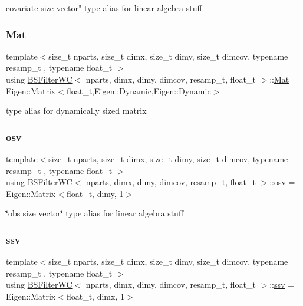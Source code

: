 covariate size vector" type alias for linear algebra stuff \mbox{\label{classBSFilterWC_a507a06203a27e3a025a43be68b4b0e0e}} 
\subsubsection{\texorpdfstring{Mat}{Mat}}
{\footnotesize\ttfamily template$<$size\+\_\+t nparts, size\+\_\+t dimx, size\+\_\+t dimy, size\+\_\+t dimcov, typename resamp\+\_\+t , typename float\+\_\+t $>$ \\
using \hyperlink{classBSFilterWC}{B\+S\+Filter\+WC}$<$ nparts, dimx, dimy, dimcov, resamp\+\_\+t, float\+\_\+t $>$\+::\hyperlink{classBSFilterWC_a507a06203a27e3a025a43be68b4b0e0e}{Mat} =  Eigen\+::\+Matrix$<$float\+\_\+t,Eigen\+::\+Dynamic,Eigen\+::\+Dynamic$>$}

type alias for dynamically sized matrix \mbox{\label{classBSFilterWC_a48b0c7f1a1cf7e57300cf820e74057ce}} 
\subsubsection{\texorpdfstring{osv}{osv}}
{\footnotesize\ttfamily template$<$size\+\_\+t nparts, size\+\_\+t dimx, size\+\_\+t dimy, size\+\_\+t dimcov, typename resamp\+\_\+t , typename float\+\_\+t $>$ \\
using \hyperlink{classBSFilterWC}{B\+S\+Filter\+WC}$<$ nparts, dimx, dimy, dimcov, resamp\+\_\+t, float\+\_\+t $>$\+::\hyperlink{classBSFilterWC_a48b0c7f1a1cf7e57300cf820e74057ce}{osv} =  Eigen\+::\+Matrix$<$float\+\_\+t, dimy, 1$>$}

\char`\"{}obs size vector\char`\"{} type alias for linear algebra stuff \mbox{\label{classBSFilterWC_afff292a8cc15505cc3aa244135203c78}} 
\subsubsection{\texorpdfstring{ssv}{ssv}}
{\footnotesize\ttfamily template$<$size\+\_\+t nparts, size\+\_\+t dimx, size\+\_\+t dimy, size\+\_\+t dimcov, typename resamp\+\_\+t , typename float\+\_\+t $>$ \\
using \hyperlink{classBSFilterWC}{B\+S\+Filter\+WC}$<$ nparts, dimx, dimy, dimcov, resamp\+\_\+t, float\+\_\+t $>$\+::\hyperlink{classBSFilterWC_afff292a8cc15505cc3aa244135203c78}{ssv} =  Eigen\+::\+Matrix$<$float\+\_\+t, dimx, 1$>$}

